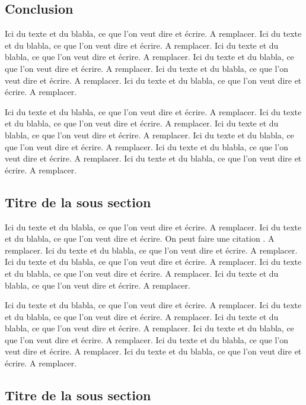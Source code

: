 \subsection{Conclusion}

Ici du texte et du blabla, ce que l'on veut dire et écrire. A remplacer. Ici du texte et du blabla, ce que l'on veut dire et écrire. A remplacer. Ici du texte et du blabla, ce que l'on veut dire et écrire. A remplacer. Ici du texte et du blabla, ce que l'on veut dire et écrire. A remplacer. Ici du texte et du blabla, ce que l'on veut dire et écrire. A remplacer. Ici du texte et du blabla, ce que l'on veut dire et écrire. A remplacer.

Ici du texte et du blabla, ce que l'on veut dire et écrire. A remplacer. Ici du texte et du blabla, ce que l'on veut dire et écrire. A remplacer. Ici du texte et du blabla, ce que l'on veut dire et écrire. A remplacer. Ici du texte et du blabla, ce que l'on veut dire et écrire. A remplacer. Ici du texte et du blabla, ce que l'on veut dire et écrire. A remplacer. Ici du texte et du blabla, ce que l'on veut dire et écrire. A remplacer.

\subsection{Titre de la sous section}

Ici du texte et du blabla, ce que l'on veut dire et écrire. A remplacer. Ici du texte et du blabla, ce que l'on veut dire et écrire. On peut faire une citation \cite{Motclef1}.
A remplacer. Ici du texte et du blabla, ce que l'on veut dire et écrire. A remplacer. Ici du texte et du blabla, ce que l'on veut dire et écrire. A remplacer. Ici du texte et du blabla, ce que l'on veut dire et écrire. A remplacer. Ici du texte et du blabla, ce que l'on veut dire et écrire. A remplacer.

Ici du texte et du blabla, ce que l'on veut dire et écrire. A remplacer. Ici du texte et du blabla, ce que l'on veut dire et écrire. A remplacer.
Ici du texte et du blabla, ce que l'on veut dire et écrire. A remplacer. Ici du texte et du blabla, ce que l'on veut dire et écrire. A remplacer. Ici du texte et du blabla, ce que l'on veut dire et écrire. A remplacer. Ici du texte et du blabla, ce que l'on veut dire et écrire. A remplacer.

\subsection{Titre de la sous section}

